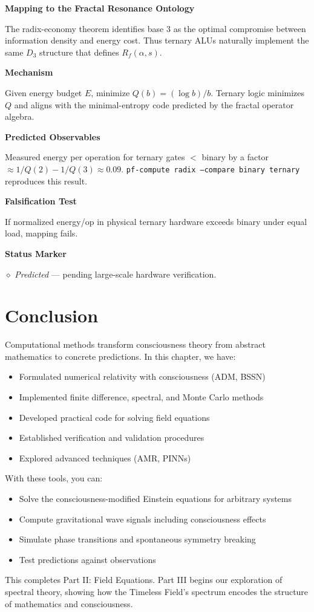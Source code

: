 \textbf{Mapping to the Fractal Resonance Ontology}

The radix-economy theorem identifies base 3 as the optimal compromise between information density and energy cost.
Thus ternary ALUs naturally implement the same $D_3$ structure that defines $R_f(\alpha,s)$.

\textbf{Mechanism}

Given energy budget $E$, minimize $Q(b) = (\log b)/b$.
Ternary logic minimizes $Q$ and aligns with the minimal-entropy code predicted by the fractal operator algebra.

\textbf{Predicted Observables}

Measured energy per operation for ternary gates $<$ binary by a factor $\approx 1/Q(2) - 1/Q(3) \approx 0.09$.
\texttt{pf-compute radix --compare binary ternary} reproduces this result.

\textbf{Falsification Test}

If normalized energy/op in physical ternary hardware exceeds binary under equal load, mapping fails.

\textbf{Status Marker}

$\diamond$ \textit{Predicted} --- pending large-scale hardware verification.

\section{Conclusion}

Computational methods transform consciousness theory from abstract mathematics to concrete predictions. In this chapter, we have:

\begin{itemize}
\item Formulated numerical relativity with consciousness (ADM, BSSN)
\item Implemented finite difference, spectral, and Monte Carlo methods
\item Developed practical code for solving field equations
\item Established verification and validation procedures
\item Explored advanced techniques (AMR, PINNs)
\end{itemize}

With these tools, you can:
\begin{itemize}
\item Solve the consciousness-modified Einstein equations for arbitrary systems
\item Compute gravitational wave signals including consciousness effects
\item Simulate phase transitions and spontaneous symmetry breaking
\item Test predictions against observations
\end{itemize}

This completes Part II: Field Equations. Part III begins our exploration of spectral theory, showing how the Timeless Field's spectrum encodes the structure of mathematics and consciousness.
